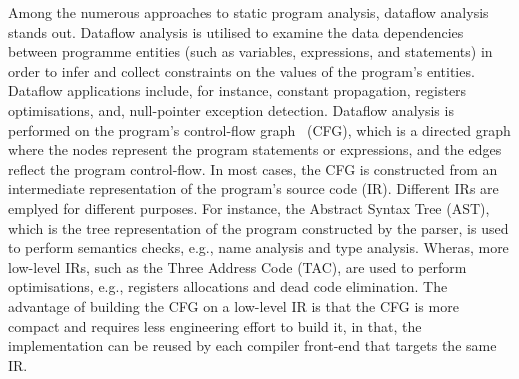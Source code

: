 

Among the numerous approaches to static program analysis, dataflow analysis stands out.
Dataflow analysis is utilised to examine the data dependencies between programme entities
(such as variables, expressions, and statements) in order to infer and collect constraints
on the values of the program's entities. Dataflow applications include, for instance,
constant propagation, registers optimisations, and, null-pointer exception detection.
Dataflow analysis is performed on the program's control-flow graph~\cite{allen1970control} (CFG), which is a
directed graph where the nodes represent the program statements or expressions,
and the edges reflect the program control-flow. In most cases, the CFG is constructed 
from an intermediate representation of the program's source code (IR).
Different IRs are emplyed for different purposes. For instance, the Abstract Syntax Tree (AST), which
is the tree representation of the program constructed by the parser, is used to perform semantics checks, e.g.,
name analysis and type analysis. Wheras, more low-level IRs, such as the Three Address Code (TAC),
are used to perform optimisations, e.g., registers allocations and dead code elimination. The advantage
of building the CFG on a low-level IR is that the CFG is more compact and requires 
less engineering effort to build it, in that, the implementation can be reused by each 
compiler front-end that targets the same IR.







